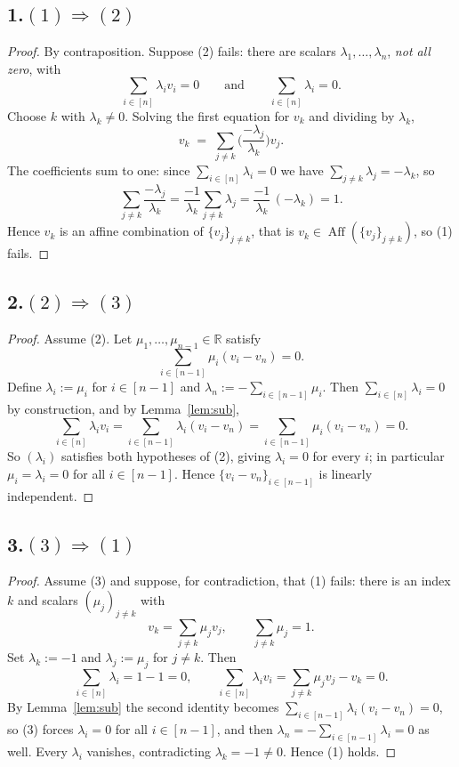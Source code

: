 \documentclass[11pt]{article}
\DeclareMathOperator{\Aff}{Aff}
\theoremstyle{definition}
\theoremstyle{plain}
\begin{document}
\subsection*{1.\quad $(1) \Rightarrow (2)$}

\begin{proof}
By contraposition. Suppose (2) fails: there are scalars
$\lambda_1,\dots,\lambda_n$, \emph{not all zero}, with
\[
  \sum_{i \in [n]} \lambda_i v_i = 0
  \qquad\text{and}\qquad
  \sum_{i \in [n]} \lambda_i = 0 .
\]
Choose $k$ with $\lambda_k \ne 0$. Solving the first equation for $v_k$
and dividing by $\lambda_k$,
\[
  v_k \;=\; \sum_{j \ne k} \Big( \frac{-\lambda_j}{\lambda_k} \Big) v_j .
\]
The coefficients sum to one: since $\sum_{i \in [n]} \lambda_i = 0$ we
have $\sum_{j \ne k} \lambda_j = -\lambda_k$, so
\[
  \sum_{j \ne k} \frac{-\lambda_j}{\lambda_k}
  = \frac{-1}{\lambda_k} \sum_{j \ne k} \lambda_j
  = \frac{-1}{\lambda_k}\,(-\lambda_k) = 1 .
\]
Hence $v_k$ is an affine combination of $\{v_j\}_{j \ne k}$, that is
$v_k \in \Aff(\{v_j\}_{j \ne k})$, so (1) fails.
\end{proof}

\subsection*{2.\quad $(2) \Rightarrow (3)$}

\begin{proof}
Assume (2). Let $\mu_1,\dots,\mu_{n-1} \in \mathbb{R}$ satisfy
\[
  \sum_{i \in [n-1]} \mu_i (v_i - v_n) = 0 .
\]
Define $\lambda_i := \mu_i$ for $i \in [n-1]$ and
$\lambda_n := -\sum_{i \in [n-1]} \mu_i$. Then
$\sum_{i \in [n]} \lambda_i = 0$ by construction, and by
Lemma~\ref{lem:sub},
\[
  \sum_{i \in [n]} \lambda_i v_i
  = \sum_{i \in [n-1]} \lambda_i (v_i - v_n)
  = \sum_{i \in [n-1]} \mu_i (v_i - v_n) = 0 .
\]
So $(\lambda_i)$ satisfies both hypotheses of (2), giving
$\lambda_i = 0$ for every $i$; in particular $\mu_i = \lambda_i = 0$ for
all $i \in [n-1]$. Hence $\{v_i - v_n\}_{i \in [n-1]}$ is linearly
independent.
\end{proof}

\subsection*{3.\quad $(3) \Rightarrow (1)$}

\begin{proof}
Assume (3) and suppose, for contradiction, that (1) fails: there is an
index $k$ and scalars $(\mu_j)_{j \ne k}$ with
\[
  v_k = \sum_{j \ne k} \mu_j v_j,
  \qquad \sum_{j \ne k} \mu_j = 1 .
\]
Set $\lambda_k := -1$ and $\lambda_j := \mu_j$ for $j \ne k$. Then
\[
  \sum_{i \in [n]} \lambda_i = 1 - 1 = 0,
  \qquad
  \sum_{i \in [n]} \lambda_i v_i = \sum_{j \ne k} \mu_j v_j - v_k = 0 .
\]
By Lemma~\ref{lem:sub} the second identity becomes
$\sum_{i \in [n-1]} \lambda_i (v_i - v_n) = 0$, so (3) forces
$\lambda_i = 0$ for all $i \in [n-1]$, and then
$\lambda_n = -\sum_{i \in [n-1]} \lambda_i = 0$ as well. Every
$\lambda_i$ vanishes, contradicting $\lambda_k = -1 \ne 0$. Hence (1)
holds.
\end{proof}
\end{document}
